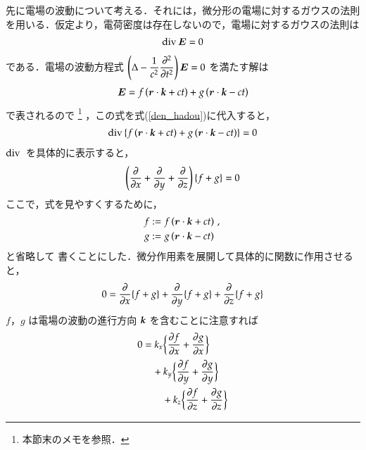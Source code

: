             先に電場の波動について考える．それには，微分形の電場に対するガウスの法則
            を用いる．仮定より，電荷密度は存在しないので，電場に対するガウスの法則は
            \begin{align}\label{den_hadou}
            \ddiv\bE=0
            \end{align}
            である．電場の波動方程式 $\displaystyle\left(\Delta-\frac{1}{{c}^{2}}
            \frac{\partial^{2}}{\partial t^{2}}\right)\boldsymbol{E}=0$ を満たす解は
            \begin{align}\label{eq:denbaba}
            \bE=f\left(\br\cdot\textit{\textbf{k}}+ct\right)
            +g\left(\br\cdot\textit{\textbf{k}}-ct\right)
            \end{align}
            で表されるので
              \footnote{
                  本節末のメモを参照．
              }
            ，この式を式(\ref{den_hadou})に代入すると，
            \begin{align*}
                    \mathrm{div}\,\{f\left(\boldsymbol{r}\cdot\textit{\textbf{k}}+ct\right)
                    +g\left(\boldsymbol{r}\cdot\textit{\textbf{k}}-ct\right)\}=0
            \end{align*}
                        $\mathrm{div}\,$ を具体的に表示すると，
            \begin{align*}
                    \left(\frac{\partial }{\partial x}+\frac{\partial }{\partial y}+\frac{\partial }{\partial z}\right)\{ f+g \} =0
            \end{align*}
            ここで，式を見やすくするために，
                        \begin{align*}
                f&:=f\left(\boldsymbol{r}\cdot\textit{\textbf{k}}+ct\right) \,,\, \\
                g&:=g\left(\boldsymbol{r}\cdot\textit{\textbf{k}}-ct\right)
            \end{align*}
            と省略して
            書くことにした．微分作用素を展開して具体的に関数に作用させると，
            \begin{align*}
                0 = \frac{\partial }{\partial x}\{ f+g\} + \frac{\partial }{\partial y}\{ f+g\} + \frac{\partial }{\partial z}\{ f+g\}
            \end{align*}
            $f$，$g$ は電場の波動の進行方向 $\textbf{\textit{k}}$ を含むことに注意すれば
            \begin{align*}
                    0 &=k_{x}\biggl\{\frac{\partial f}{\partial x}+\frac{\partial g}{\partial x}\biggr\} \\
                      &\quad  + k_{y}\biggl\{\frac{\partial f}{\partial y}+\frac{\partial g}{\partial y}\biggr\} \\
                      &\qquad + k_{z}\biggl\{\frac{\partial f}{\partial z}+\frac{\partial g}{\partial z}\biggr\}
            \end{align*}
